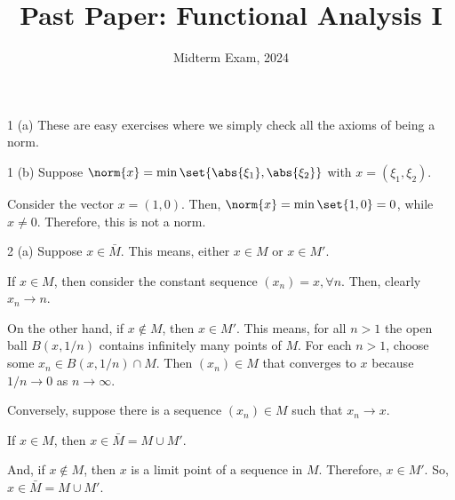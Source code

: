 \documentclass[11pt]{penrose}
\title{Past Paper: Functional Analysis I}
\subtitle{Midterm Exam, 2024}
\begin{document}
\maketitle
\warningtext

\begin{problem}{1 (a)}
    These are easy exercises where we simply check all the axioms of being a norm.
\end{problem}

\begin{problem}{1 (b)}
    Suppose $\norm{x} = \min\set{\abs{\xi_{1}}, \abs{\xi_{2}}}$ with $x = (\xi_{1}, \xi_{2})$.

    Consider the vector $x = (1,0)$. Then, $\norm{x} = \min\set{1,0} = 0$, while $x \neq 0$. Therefore, this is not a norm.
\end{problem}

\begin{problem}{2 (a)}
    Suppose $x \in \bar{M}$. This means, either $x \in M$ or $x \in M'$.

    If $x \in M$, then consider the constant sequence $(x_{n}) = x, \forall n$. Then, clearly $x_{n} \to n$.

    On the other hand, if $x \notin M$, then $x \in M'$. This means, for all $n > 1$ the open ball $B(x, 1/n)$ contains infinitely many points of $M$. For each $n > 1$, choose some $x_{n} \in B(x, 1/n) \cap M$. Then $(x_{n}) \in M$ that converges to $x$ because $1/n \to 0$ as $n \to \infty$.

    Conversely, suppose there is a sequence $(x_{n}) \in M$ such that $x_{n} \to x$.

    If $x \in M$, then $x \in \bar{M} = M \cup M'$.

    And, if $x \notin M$, then $x$ is a limit point of a sequence in $M$. Therefore, $x \in M'$. So, $x \in \bar{M} = M \cup M'$.
\end{problem}
\end{document}
